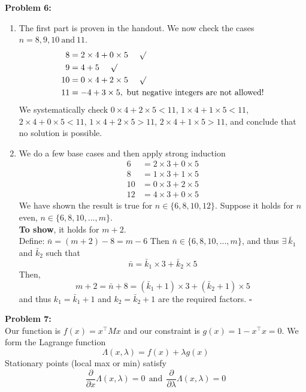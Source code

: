 \documentclass[letterpaper]{article}
\begin{document}
\bigskip
\noindent \textbf{Problem 6:}
\begin{enumerate}
\setlength{\itemsep}{.1in}
\renewcommand{\labelenumi}{(\alph{enumi})}
\item  The first part is proven in the handout. We now check the cases $n=8,9,10~\text{and}~ 11$.
    $$\begin{aligned}
        8  &= 2 \times 4 + 0 \times 5 ~~~~ \surd \\
        9  &= 4 + 5 ~~~~ \surd \\
        10 &= 0 \times 4 + 2 \times 5 ~~~~ \surd \\
        11 &= -4 + 3 \times 5, \text{~but negative integers are not allowed!}
    \end{aligned}$$
We systematically check $0 \times 4 + 2 \times 5  < 11$, $1 \times 4 + 1 \times 5 <11$,  $2 \times 4 + 0 \times 5 <11$, $1 \times 4 + 2 \times 5  >11$, $2 \times 4 + 1 \times 5 >11$, and conclude that no solution is possible.

\item We do a few base cases and then apply strong induction
    $$\begin{aligned}
        6  &= 2 \times 3 + 0 \times 5 \\
        8  &= 1 \times 3 + 1 \times 5 \\
        10 &= 0 \times 3 + 2 \times 5 \\
        12 &= 4 \times 3 + 0 \times 5
    \end{aligned}$$
We have shown the result is true for $n\in \{6,8,10,12\}.$ Suppose it holds for $n$ even, $n\in \{6,8,10,...,m\}.$
\medskip \\
\textbf{To show}, it holds for $m+2$.
\medskip \\
Define: $\bar{n}=(m+2)-8=m-6$
Then $\bar{n} \in \{6,8,10,...,m\}$, and thus $\exists ~ \bar{k}_1$ and $\bar{k}_2$ such that
$$ \bar{n} = \bar{k}_1 \times 3 + \bar{k}_2 \times 5 $$
Then,
$$ m+2 = \bar{n} +8 = (\bar{k}_1+1)\times 3 + (\bar{k}_2+1) \times 5$$
and thus $k_1=\bar{k}_1 + 1$ and $k_2 = \bar{k}_2 +1$
are the required factors. \hfill $\square$
\end{enumerate}

\bigskip
\noindent \textbf{Problem 7:}
\medskip \\
Our function is $f(x)=x^\top M x$ and our constraint is $g(x)=1-x^\top x =0$.
We form the Lagrange function
    $$\Lambda(x,\lambda)=f(x)+\lambda g(x)$$
Stationary points (local max or min) satisfy
    $$ \frac{\partial}{\partial x}\Lambda(x,\lambda)=0 ~~\text{and}~~ \frac{\partial}{\partial \lambda}\Lambda(x,\lambda)=0 $$
\end{document}

